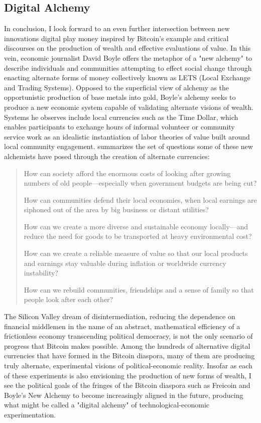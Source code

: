 \subsection*{Digital Alchemy}
In conclusion, I look forward to an even further intersection between new innovations digital play money inspired by Bitcoin's example and critical discourses on the production of wealth and effective evaluations of value. In this vein, economic journalist David Boyle offers the metaphor of a "new alchemy" to describe individuals and communities attempting to effect social change through enacting alternate forms of money collectively known as LETS (Local Exchange and Trading Systems). Opposed to the superficial view of alchemy as the opportunistic production of base metals into gold, Boyle's alchemy seeks to produce a new economic system capable of validating alternate visions of wealth. Systems he observes include local currencies such as the Time Dollar, which enables participants to exchange hours of informal volunteer or community service work as an idealistic instantiation of labor theories of value built around local community engagement. \citeauthor{Boyle99} summarizes the set of questions some of these new alchemists have posed through the creation of alternate currencies:

\blockcquote[200]{Boyle99}{
  How can society afford the enormous costs of looking after growing numbers of old people---especially when government budgets are being cut?
  
	How can communities defend their local economies, when local earnings are siphoned out of the area by big business or distant utilities?
  
	How can we create a more diverse and sustainable economy locally---and reduce the need for goods to be transported at heavy environmental cost?
  
	How can we create a reliable measure of value so that our local products and earnings stay valuable during inflation or worldwide currency instability?
  
	How can we rebuild communities, friendships and a sense of family so that people look after each other?
}
The Silicon Valley dream of disintermediation, reducing the dependence on financial middlemen in the name of an abstract, mathematical efficiency of a frictionless economy transcending political democracy, is not the only scenario of progress that Bitcoin makes possible. Among the hundreds of alternative digital currencies that have formed in the Bitcoin diaspora, many of them are producing truly alternate, experimental visions of political-economic reality. Insofar as each of these experiments is also envisioning the production of new forms of wealth, I see the political goals of the fringes of the Bitcoin diaspora such as Freicoin and Boyle's New Alchemy to become increasingly aligned in the future, producing what might be called a "digital alchemy" of technological-economic experimentation.

